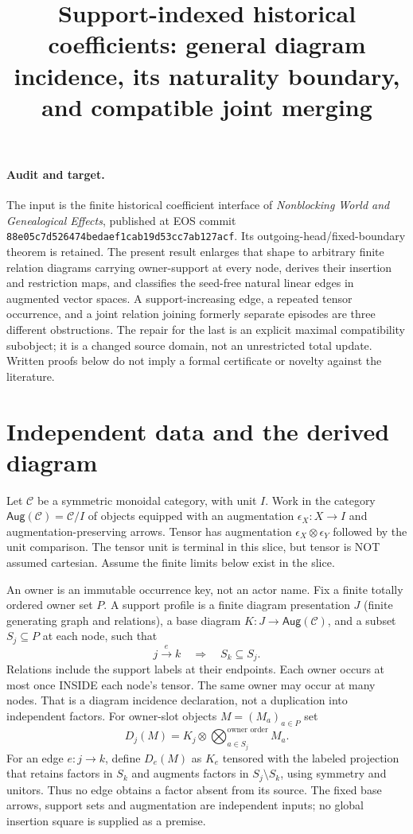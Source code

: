 \documentclass[11pt]{article}
\title{Support-indexed historical coefficients: general diagram incidence, its naturality boundary, and compatible joint merging}
\author{}\date{}
\newcommand{\Aug}{\mathsf{Aug}}\newcommand{\supp}{\mathop{\rm supp}}
\begin{document}
\maketitle
\paragraph{Audit and target.}
The input is the finite historical coefficient interface of \emph{Nonblocking World and Genealogical Effects}, published at EOS commit \texttt{88e05c7d526474bedaef1cab19d53cc7ab127acf}. Its outgoing-head/fixed-boundary theorem is retained. The present result enlarges that shape to arbitrary finite relation diagrams carrying owner-support at every node, derives their insertion and restriction maps, and classifies the seed-free natural linear edges in augmented vector spaces. A support-increasing edge, a repeated tensor occurrence, and a joint relation joining formerly separate episodes are three different obstructions. The repair for the last is an explicit maximal compatibility subobject; it is a changed source domain, not an unrestricted total update. Written proofs below do not imply a formal certificate or novelty against the literature.

\section{Independent data and the derived diagram}
Let $\mathcal C$ be a symmetric monoidal category, with unit $I$. Work in the category $\Aug(\mathcal C)=\mathcal C/I$ of objects equipped with an augmentation $\epsilon_X:X\to I$ and augmentation-preserving arrows. Tensor has augmentation $\epsilon_X\otimes\epsilon_Y$ followed by the unit comparison. The tensor unit is terminal in this slice, but tensor is NOT assumed cartesian. Assume the finite limits below exist in the slice.

An owner is an immutable occurrence key, not an actor name. Fix a finite totally ordered owner set $P$. A support profile is a finite diagram presentation $J$ (finite generating graph and relations), a base diagram $K:J\to\Aug(\mathcal C)$, and a subset $S_j\subseteq P$ at each node, such that
\[
 j\xrightarrow{e}k\quad\Longrightarrow\quad S_k\subseteq S_j.\tag{1}
\]
Relations include the support labels at their endpoints. Each owner occurs at most once INSIDE each node's tensor. The same owner may occur at many nodes. That is a diagram incidence declaration, not a duplication into independent factors. For owner-slot objects $M=(M_a)_{a\in P}$ set
\[
 D_j(M)=K_j\otimes\bigotimes_{a\in S_j}^{\text{owner order}}M_a.
\]
For an edge $e:j\to k$, define $D_e(M)$ as $K_e$ tensored with the labeled projection that retains factors in $S_k$ and augments factors in $S_j\setminus S_k$, using symmetry and unitors. Thus no edge obtains a factor absent from its source. The fixed base arrows, support sets and augmentation are independent inputs; no global insertion square is supplied as a premise.
\end{document}
